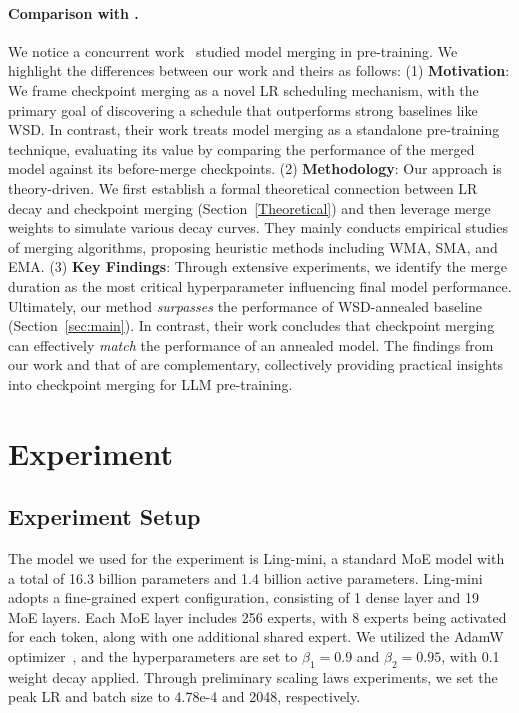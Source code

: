 \paragraph{Comparison with \cite{pma}.} 
We notice a concurrent work~\citep{pma} studied model merging in pre-training. We highlight the differences between our work and theirs as follows: 
(1) \textbf{Motivation}: We frame checkpoint merging as a novel LR scheduling mechanism, with the primary goal of discovering a schedule that outperforms strong baselines like WSD. In contrast, their work treats model merging as a standalone pre-training technique, evaluating its value by comparing the performance of the merged model against its before-merge checkpoints.
(2) \textbf{Methodology}: Our approach is theory-driven. We first establish a formal theoretical connection between LR decay and checkpoint merging (Section~\ref{Theoretical}) and then leverage merge weights to simulate various decay curves. They mainly conducts empirical studies of merging algorithms, proposing heuristic methods including WMA, SMA, and EMA. 
(3) \textbf{Key Findings}: Through extensive experiments, we identify the merge duration as the most critical hyperparameter influencing final model performance. Ultimately, our method \textit{surpasses} the performance of WSD-annealed baseline (Section~\ref{sec:main}). In contrast, their work concludes that checkpoint merging can effectively \textit{match} the performance of an annealed model. 
The findings from our work and that of \cite{pma} are complementary, collectively providing practical insights into checkpoint merging for LLM pre-training.


\section{Experiment}
\label{sec:exp}

\subsection{Experiment Setup}
The model we used for the experiment is Ling-mini, a standard MoE model with a total of 16.3 billion parameters and 1.4 billion active parameters. Ling-mini adopts a fine-grained expert configuration, consisting of 1 dense layer and 19 MoE layers. Each MoE layer includes 256 experts, with 8 experts being activated for each token, along with one additional shared expert. We utilized the AdamW optimizer~\citep{adamw}, and the hyperparameters are set to $\beta_1 = 0.9$ and $\beta_2 = 0.95$, with 0.1 weight decay applied. Through preliminary scaling laws experiments, we set the peak LR and batch size to 4.78e-4 and 2048, respectively.

